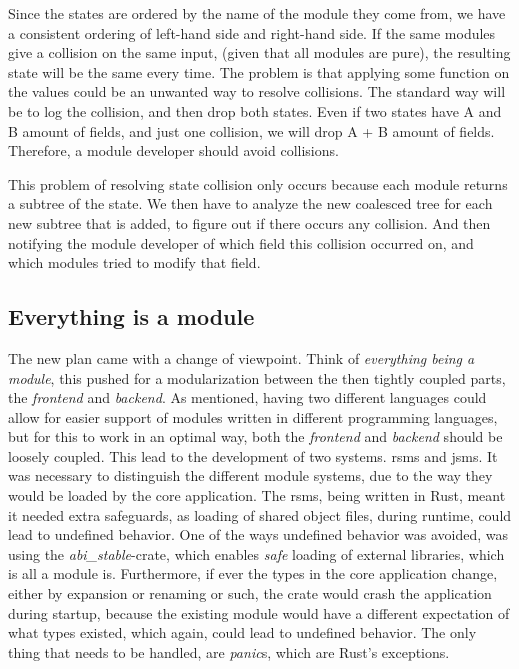 Since the states are ordered by the name of the module they come from, we
have a consistent ordering of left-hand side and right-hand side. If the same
modules give a collision on the same input, (given that all modules are pure), the
resulting state will be the same every time. The problem is that applying some
function on the values could be an unwanted way to resolve collisions. The
standard way will be to log the collision, and then drop both states. Even
if two states have A and B amount of fields, and just one collision, we will
drop A + B amount of fields. Therefore, a module developer should avoid
collisions.

\begin{center}
  
\end{center}


This problem of resolving state collision only occurs because each module
returns a subtree of the state. We then have to analyze the new coalesced tree
for each new subtree that is added, to figure out if there occurs any collision.
And then notifying the module developer of which field this collision occurred
on, and which modules tried to modify that field.

\subsection{Everything is a module}

The new plan came with a change of viewpoint. Think of
\textit{everything being a module}, this pushed for a modularization between the
then tightly coupled parts, the \textit{frontend} and \textit{backend}. As
mentioned, having two different languages could allow for easier support of
modules written in different programming languages, but for this to work in an
optimal way, both the \textit{frontend} and \textit{backend} should be loosely
coupled. This lead to the development of two systems. \gls{rsms} and \gls{jsms}.
It was necessary to distinguish the different module systems, due to the way
they would be loaded by the core application.
The \gls{rsms}, being written in Rust, meant it needed extra safeguards, as
loading of shared object files, during runtime, could lead to undefined
behavior.
One of the ways undefined behavior was avoided, was using the
\textit{abi\_stable}-crate, which enables \textit{safe} loading of external
libraries, which is all a module is.
Furthermore, if ever the types in the core application change, either by
expansion or renaming or such, the crate would crash the application during
startup, because the existing module would have a different expectation of what
types existed, which again, could lead to undefined behavior. The only thing
that needs to be handled, are \textit{panic}s, which are Rust's exceptions.


